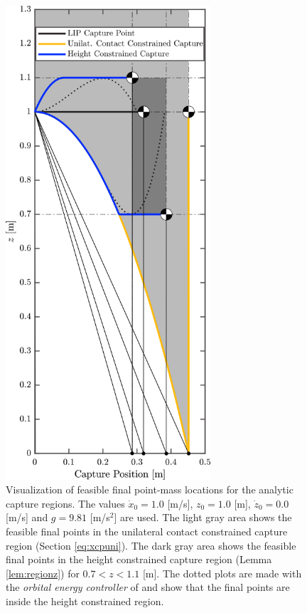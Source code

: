 \begin{figure}
      \centering
      \includegraphics[width=3in]{STYLESTUFF/CPLimitsDark1.png}
      \caption{Visualization of feasible final point-mass locations for the analytic capture regions. The values $\dot{x}_0=1.0$ [m/s], $z_0=1.0$ [m], $\dot{z}_0=0.0$ [m/s] and $g=9.81$ [m/s$^2$] are used. The light gray area shows the feasible final points in the unilateral contact constrained capture region (Section \ref{eq:xcpuni}). The dark gray area shows the feasible final points in the height constrained capture region (Lemma \ref{lem:regionz})  for $0.7<z<1.1$ [m]. The dotted plots are made with the \textit{orbital energy controller} of \cite{koolen2016balance} and show that the final points are inside the height constrained region.}
      \label{fig:capregion}
\end{figure}

